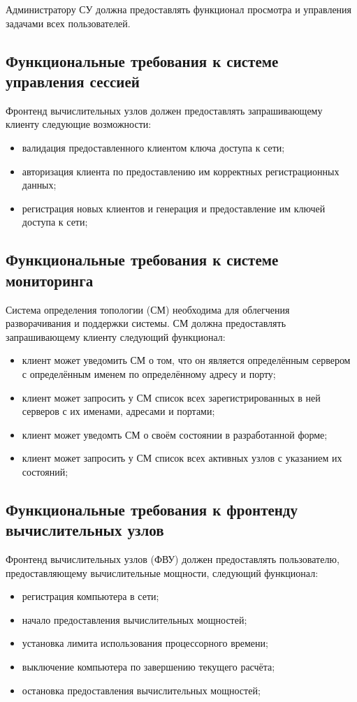 \documentclass[a4paper,12pt]{report}
\numberwithin{equation}{section}
\begin{document}
Администратору СУ должна предоставлять функционал просмотра и управления задачами всех пользователей.

\subsection{Функциональные требования к системе управления сессией}
Фронтенд вычислительных узлов должен предоставлять запрашивающему клиенту следующие возможности:
\begin{itemize}
    \item валидация предоставленного клиентом ключа доступа к сети;
    \item авторизация клиента по предоставлению им корректных регистрационных данных;
    \item регистрация новых клиентов и генерация и предоставление им ключей доступа к сети;
\end{itemize}

\subsection{Функциональные требования к системе мониторинга}
Система определения топологии (СМ) необходима для облегчения разворачивания и поддержки системы.
СМ должна предоставлять запрашивающему клиенту следующий функционал:
\begin{itemize}
  \item клиент может уведомить СМ о том, что он является определённым сервером с определённым именем по определённому адресу и порту;
  \item клиент может запросить у СМ список всех зарегистрированных в ней серверов с их именами, адресами и портами;
  \item клиент может уведомть СМ о своём состоянии в разработанной форме;
  \item клиент может запросить у СМ список всех активных узлов с указанием их состояний;
\end{itemize}

\subsection{Функциональные требования к фронтенду вычислительных узлов}
Фронтенд вычислительных узлов (ФВУ) должен предоставлять пользователю, предоставляющему вычислительные мощности, следующий функционал:
\begin{itemize}
    \item регистрация компьютера в сети;
    \item начало предоставления вычислительных мощностей;
    \item установка лимита использования процессорного времени;
    \item выключение компьютера по завершению текущего расчёта;
    \item остановка предоставления вычислительных мощностей;
\end{itemize}
\end{document}
